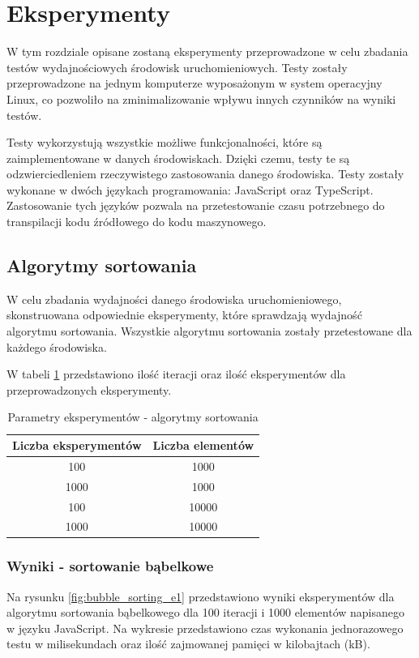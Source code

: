 \section{Eksperymenty}
W tym rozdziale opisane zostaną eksperymenty przeprowadzone w celu zbadania testów wydajnościowych środowisk uruchomieniowych. Testy zostały przeprowadzone na jednym komputerze wyposażonym w system operacyjny Linux, co pozwoliło na zminimalizowanie wpływu innych czynników na wyniki testów.

Testy wykorzystują wszystkie możliwe funkcjonalności, które są zaimplementowane w danych środowiskach. Dzięki czemu, testy te są odzwierciedleniem rzeczywistego zastosowania danego środowiska. Testy zostały wykonane w dwóch językach programowania: JavaScript oraz TypeScript. Zastosowanie tych języków pozwala na przetestowanie czasu potrzebnego do transpilacji kodu źródłowego do kodu maszynowego. 

\subsection{Algorytmy sortowania}
W celu zbadania wydajności danego środowiska uruchomieniowego, skonstruowana odpowiednie eksperymenty, które sprawdzają wydajność algorytmu sortowania. Wszystkie algorytmu sortowania zostały przetestowane dla każdego środowiska.

W tabeli \ref{tab:sorting_experiments} przedstawiono ilość iteracji oraz ilość eksperymentów dla przeprowadzonych eksperymenty.

\begin{table}[H]
  \centering
  \caption{Parametry eksperymentów - algorytmy sortowania}
  \begin{tabular}{|c|c|}
    \hline
    \textbf{Liczba eksperymentów} & \textbf{Liczba elementów} \\ \hline
    100 & 1000 \\ \hline
    1000 & 1000 \\ \hline
    100 & 10000 \\ \hline
    1000 & 10000 \\ \hline
  \end{tabular}
  \label{tab:sorting_experiments}
\end{table}

\subsubsection{Wyniki - sortowanie bąbelkowe}
Na rysunku \ref{fig:bubble_sorting_e1} przedstawiono wyniki eksperymentów dla algorytmu sortowania bąbelkowego dla 100 iteracji i 1000 elementów napisanego w języku JavaScript. Na wykresie przedstawiono czas wykonania jednorazowego testu w milisekundach oraz ilość zajmowanej pamięci w kilobajtach (kB).

